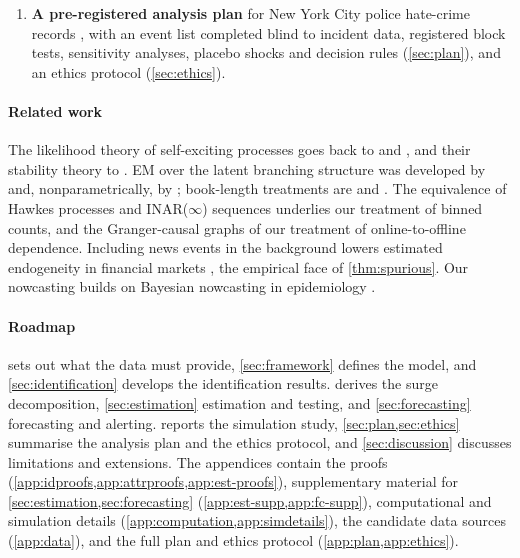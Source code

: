 \begin{enumerate}[label=\textbf{C\arabic*},ref=C\arabic*,leftmargin=2.4em,itemsep=2pt]
  imputation-based alert of \cref{alg:alert}, the sup-statistic for a decay
  identified only under the alternative (with its Davies approximation and
  bootstrap), nonparametric kernels, the INAR approximation, placebo
  calibration and the CUSUM monitor.
  \item\label{contrib:plan} \textbf{A pre-registered analysis plan} for New
  York City police hate-crime records \citep{nypdhate}, with an event list
  completed blind to incident data, registered block tests, sensitivity
  analyses, placebo shocks and decision rules (\cref{sec:plan}), and an ethics
  protocol (\cref{sec:ethics}).
\end{enumerate}

\paragraph{Related work}
The likelihood theory of self-exciting processes goes back to
\citet{ogata1978} and \citet{ogata1988}, and their stability theory to
\citet{bremaud1996}. EM over the latent branching structure was developed by
\citet{veen2008} and, nonparametrically, by \citet{marsan2008}; book-length
treatments are \citet{daley2003} and \citet{laub2021}. The equivalence of
Hawkes processes and INAR($\infty$) sequences \citep{kirchner2016} underlies
our treatment of binned counts, and the Granger-causal graphs of
\citet{eichler2017} our treatment of online-to-offline dependence. Including
news events in the background lowers estimated endogeneity in financial
markets \citep{rambaldi2015}, the empirical face of \cref{thm:spurious}. Our
nowcasting builds on Bayesian nowcasting in epidemiology
\citep{hohle2014,mcgough2020}.

\paragraph{Roadmap}
 sets out what the data must provide, \cref{sec:framework}
defines the model, and \cref{sec:identification} develops the identification
results.  derives the surge decomposition,
\cref{sec:estimation} estimation and testing, and \cref{sec:forecasting}
forecasting and alerting.  reports the simulation study,
\cref{sec:plan,sec:ethics} summarise the analysis plan and the ethics
protocol, and \cref{sec:discussion} discusses limitations and extensions. The
appendices contain the proofs (\cref{app:idproofs,app:attrproofs,app:est-proofs}),
supplementary material for \cref{sec:estimation,sec:forecasting}
(\cref{app:est-supp,app:fc-supp}), computational and simulation details
(\cref{app:computation,app:simdetails}), the candidate data sources
(\cref{app:data}), and the full plan and ethics protocol
(\cref{app:plan,app:ethics}).
